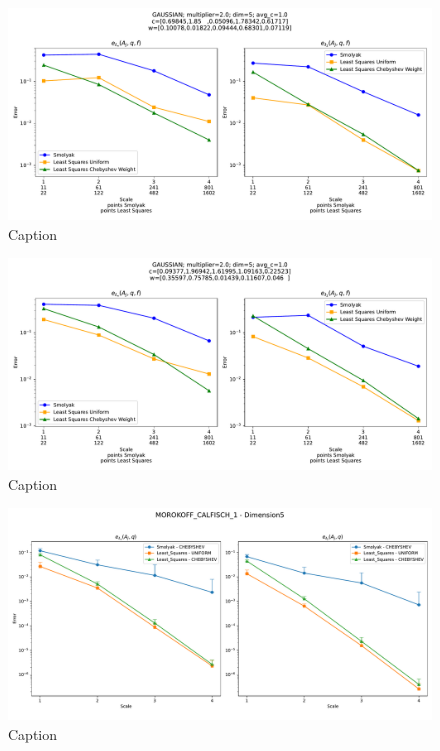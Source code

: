 \documentclass[12pt, oneside]{amsart}
\theoremstyle{definition}
\theoremstyle{remark}
\numberwithin{equation}{section}
\begin{document}
\begin{figure}[H]
	\centering
	\includegraphics[width=\linewidth]{figures/oscillatory/realization2_dim5_scale4.pdf}
	\caption{Caption}
	\label{fig:Osc_2_dim5_scale4}
\end{figure}

\begin{figure}[H]
	\centering
	\includegraphics[width=\linewidth]{figures/oscillatory/realization3_dim5_scale4.pdf}
	\caption{Caption}
	\label{fig:Osc_3_dim5_scale4}
\end{figure}

\begin{figure}[H]
	\centering
	\includegraphics[width=\linewidth]{figures/morokoff_calfisch1/distro_dim5_scale4.pdf}
	\caption{Caption}
	\label{fig:morokoff_calfisch1_distribution_dim5_scale4}
\end{figure}
\end{document}
